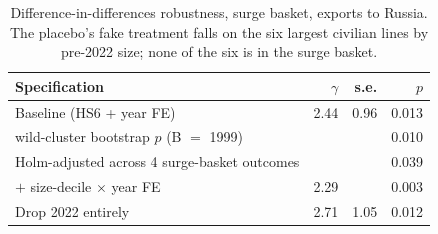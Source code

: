 \documentclass[12pt]{article}
\begin{document}
\begin{table}[htbp]
\centering
\caption{Difference-in-differences robustness, surge basket, exports to Russia. The placebo's
fake treatment falls on the six largest civilian lines by pre-2022 size; none of the six is in
the surge basket.}
\label{tab:appc}
\footnotesize
\begin{tabular}{@{}lrrr@{}}
\toprule
Specification & $\gamma$ & s.e. & $p$ \\
\midrule
Baseline (HS6 + year FE)                              & 2.44 & 0.96 & 0.013 \\
\quad wild-cluster bootstrap $p$ (B $=$ 1999)          &      &      & 0.010 \\
\quad Holm-adjusted across 4 surge-basket outcomes     &      &      & 0.039 \\
$+$ size-decile $\times$ year FE                       & 2.29 &      & 0.003 \\
Drop 2022 entirely                                    & 2.71 & 1.05 & 0.012 \\


\end{tabular}
\end{table}
\end{document}
